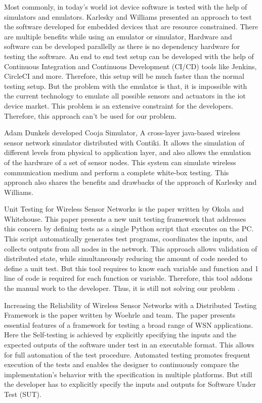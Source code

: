 \documentclass[conference]{IEEEtran}
\theoremstyle{definition}
\begin{document}
Most commonly, in today’s world \ac{iot} device software is tested with the help of simulators and emulators. 
Karlesky and Williams presented an approach \cite{karlesky2007mocking} to test the software developed for embedded devices that are resource constrained. 
There are multiple benefits while using an emulator or simulator, Hardware and software can be developed parallelly as there is no dependency hardware for testing the software. 
An end to end test setup can be developed with the help of Continuous Integration and Continuous Development (CI/CD) tools like Jenkins, CircleCI and more. 
Therefore, this setup will be much faster than the normal testing setup. 
But the problem with the emulator is that, it is impossible with the current technology to emulate all possible sensors and actuators in the \ac{iot} device market. 
This problem is an extensive constraint for the developers. 
Therefore, this approach can’t be used for our problem.

Adam Dunkels developed Cooja Simulator, A cross-layer java-based wireless sensor network simulator distributed with Contiki. 
It allows the simulation of different levels from physical to application layer, and also allows the emulation of the hardware of a set of sensor nodes. 
This system can simulate wireless communication medium and perform a complete white-box testing. 
This approach also shares the benefits and drawbacks of the approach of Karlesky and Williams.

Unit Testing for Wireless Sensor Networks is the paper written by Okola and Whitehouse. 
This paper presents a new unit testing framework that addresses this concern by defining tests as a single Python script that executes on the PC. 
This script automatically generates test programs, coordinates the inputs, and collects outputs from all nodes in the network. 
This approach allows validation of distributed state, while simultaneously reducing the amount of code needed to define a unit test. 
But this tool requires to know each variable and function and 1 line of code is required for each function or variable. 
Therefore, this tool addons the manual work to the developer. 
Thus, it is still not solving our problem \cite{okola2010unit}.

Increasing the Reliability of Wireless Sensor Networks with a Distributed Testing Framework is the paper written by Woehrle and team. 
The paper presents essential features of a framework for testing a broad range of WSN applications. 
Here the Self-testing is achieved by explicitly specifying the inputs and the expected outputs of the software under test in an executable format. 
This allows for full automation of the test procedure. 
Automated testing promotes frequent execution of the tests and enables the designer to continuously compare the implementation’s behavior with the specification in multiple platforms. 
But still the developer has to explicitly specify the inputs and outputs for Software Under Test (SUT).
\end{document}
